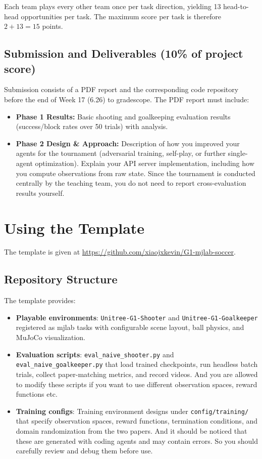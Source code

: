 \documentclass{article}
\begin{document}
Each team plays every other team once per task direction, yielding 13 head-to-head opportunities per task. The maximum score per task is therefore $2 + 13 = 15$ points.

\subsection{Submission and Deliverables (10\% of project score)}
Submission consists of a PDF report and the corresponding code repository before the end of Week 17 (6.26) to gradescope. The PDF report must include:
\begin{itemize}
    \item \textbf{Phase 1 Results:} Basic shooting and goalkeeping evaluation results (success/block rates over 50 trials) with analysis.
    \item \textbf{Phase 2 Design \& Approach:} Description of how you improved your agents for the tournament (adversarial training, self-play, or further single-agent optimization). Explain your API server implementation, including how you compute observations from raw state. Since the tournament is conducted centrally by the teaching team, you do not need to report cross-evaluation results yourself.
\end{itemize}


\section{Using the Template}

The template is given at \href{https://github.com/xiaojxkevin/G1-mjlab-soccer}{https://github.com/xiaojxkevin/G1-mjlab-soccer}.

\subsection{Repository Structure}

The template provides:

\begin{itemize}
  \item \textbf{Playable environments}: \texttt{Unitree-G1-Shooter} and \texttt{Unitree-G1-Goalkeeper} registered as mjlab tasks with configurable scene layout, ball physics, and MuJoCo visualization.
  \item \textbf{Evaluation scripts}: \texttt{eval\_naive\_shooter.py} and \texttt{eval\_naive\_goalkeeper.py} that load trained checkpoints, run headless batch trials, collect paper-matching metrics, and record videos. And you are allowed to modify these scripts if you want to use different observation spaces, reward functions etc.
  \item \textbf{Training configs}: Training environment designs under \texttt{config/training/} that specify observation spaces, reward functions, termination conditions, and domain randomization from the two papers. And it should be noticed that these are generated with coding agents and may contain errors. So you should carefully review and debug them before use.
\end{itemize}
\end{document}
